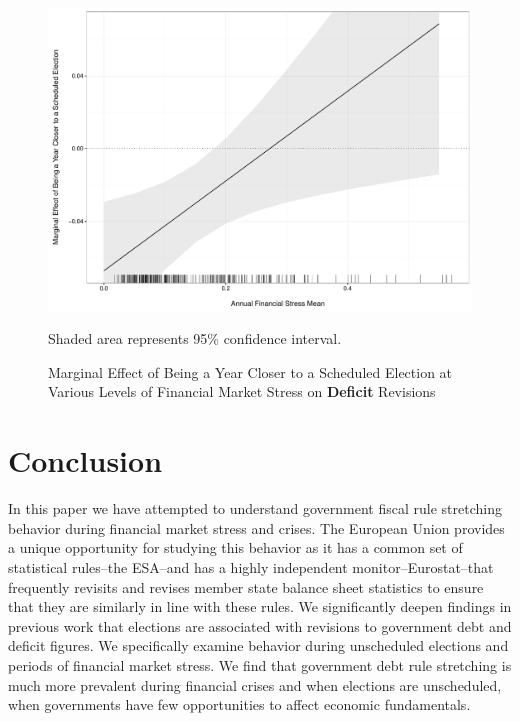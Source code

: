 \documentclass[]{article}
\begin{document}
\begin{figure}
    \caption{Marginal Effect of Being a Year Closer to a Scheduled Election at Various Levels of Financial Market Stress on \textbf{Deficit} Revisions}
    \label{me_finstress_non_elect_deficit}
    \begin{center}
        \includegraphics[scale=0.4]{figures/fsi_elect_timing_deficit_me.pdf}
    \end{center}

	{\scriptsize{Shaded area represents 95\% confidence interval.}}

\end{figure}


\section{Conclusion}

In this paper we have attempted to understand government fiscal rule stretching behavior during financial market stress and crises. The European Union provides a unique opportunity for studying this behavior as it has a common set of statistical rules--the ESA--and has a highly independent monitor--Eurostat--that frequently revisits and revises member state balance sheet statistics to ensure that they are similarly in line with these rules. We significantly deepen findings in previous work that elections are associated with revisions to government debt and deficit figures. We specifically examine behavior during unscheduled elections and periods of financial market stress. We find that government debt rule stretching is much more prevalent during financial crises and when elections are unscheduled, when governments have few opportunities to affect economic fundamentals.
\end{document}
